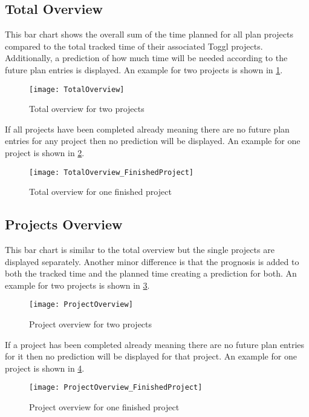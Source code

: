 \subsection{Total Overview}
This bar chart shows the overall sum of the time planned for all plan projects compared to the total tracked time of their associated Toggl projects. Additionally, a prediction of how much time will be needed according to the future plan entries is displayed. An example for two projects is shown in \ref{totalOverview}.
\begin{figure}[H]
	\centering
	\texttt{[image: TotalOverview]}
	\caption{Total overview for two projects}
	\label{totalOverview}
\end{figure}
If all projects have been completed already meaning there are no future plan entries for any project then no prediction will be displayed. An example for one project is shown in \ref{totalOverviewFinished}.
\begin{figure}[H]
	\centering
	\texttt{[image: TotalOverview\_FinishedProject]}
	\caption{Total overview for one finished project}
	\label{totalOverviewFinished}
\end{figure}

\subsection{Projects Overview}
This bar chart is similar to the total overview but the single projects are displayed separately. Another minor difference is that the prognosis is added to both the tracked time and the planned time creating a prediction for both. An example for two projects is shown in \ref{projectOverview}.
\begin{figure}[H]
	\centering
	\texttt{[image: ProjectOverview]}
	\caption{Project overview for two projects}
	\label{projectOverview}
\end{figure}
If a project has been completed already meaning there are no future plan entries for it then no prediction will be displayed for that project. An example for one project is shown in \ref{projectOverviewFinished}.
\begin{figure}[H]
	\centering
	\texttt{[image: ProjectOverview\_FinishedProject]}
	\caption{Project overview for one finished project}
	\label{projectOverviewFinished}
\end{figure}

